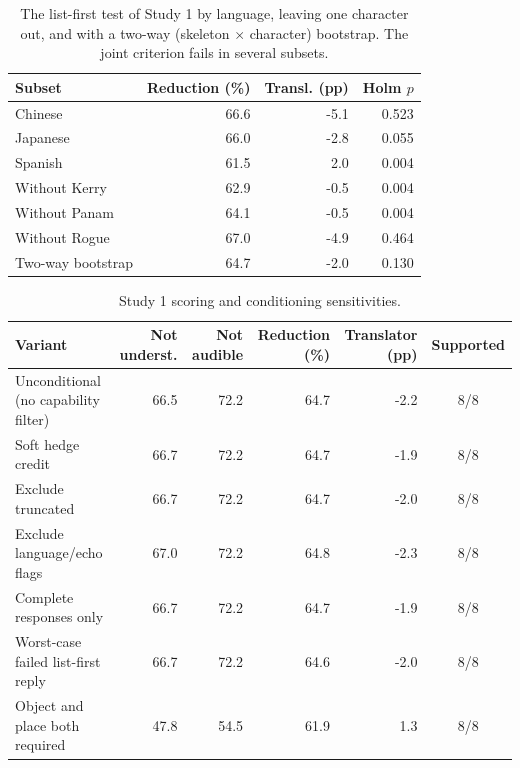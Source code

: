 \documentclass[11pt]{article}
\begin{document}
\begin{table}[!tp]
\centering\sffamily\footnotesize\renewcommand{\arraystretch}{1.12}\setlength{\tabcolsep}{3.2pt}
\begin{tabular*}{\linewidth}{@{\extracolsep{\fill}}lrrr@{}}
\toprule
\textbf{Subset} & \textbf{Reduction (\%)} & \textbf{Transl. (pp)} & \textbf{Holm $p$}\\
\midrule
Chinese & 66.6 & -5.1 & 0.523\\
Japanese & 66.0 & -2.8 & 0.055\\
Spanish & 61.5 & 2.0 & 0.004\\
Without Kerry & 62.9 & -0.5 & 0.004\\
Without Panam & 64.1 & -0.5 & 0.004\\
Without Rogue & 67.0 & -4.9 & 0.464\\
Two-way bootstrap & 64.7 & -2.0 & 0.130\\
\bottomrule
\end{tabular*}
\caption{The list-first test of Study 1 by language, leaving one character out, and with a two-way (skeleton $\times$ character) bootstrap. The joint criterion fails in several subsets.}
\label{tab:s1sub}
\end{table}
\begin{table}[!tp]
\centering\setlength{\tabcolsep}{4.5pt}\small
\begin{tabular*}{\linewidth}{@{\extracolsep{\fill}}lrrrrc@{}}
\toprule
\textbf{Variant} & \textbf{Not underst.} & \textbf{Not audible} & \textbf{Reduction (\%)} & \textbf{Translator (pp)} & \textbf{Supported}\\
\midrule
Unconditional (no capability filter) & 66.5 & 72.2 & 64.7 & -2.2 & 8/8\\
Soft hedge credit & 66.7 & 72.2 & 64.7 & -1.9 & 8/8\\
Exclude truncated & 66.7 & 72.2 & 64.7 & -2.0 & 8/8\\
Exclude language/echo flags & 67.0 & 72.2 & 64.8 & -2.3 & 8/8\\
Complete responses only & 66.7 & 72.2 & 64.7 & -1.9 & 8/8\\
Worst-case failed list-first reply & 66.7 & 72.2 & 64.6 & -2.0 & 8/8\\
Object and place both required & 47.8 & 54.5 & 61.9 & 1.3 & 8/8\\
\bottomrule
\end{tabular*}
\caption{Study 1 scoring and conditioning sensitivities.}
\label{tab:s1sens}
\end{table}
\end{document}
